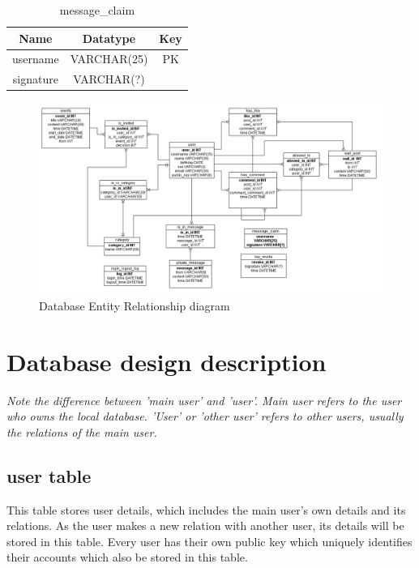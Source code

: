 \begin{table}[!ht]
\caption{message\_claim}
\centering
\begin{tabular}{c c c}
\hline\hline
Name               & Datatype    & Key \\
\hline
username           & VARCHAR(25) & PK  \\
signature          & VARCHAR(?)  &     \\
\hline
\end{tabular}
\label{table:nonlin}
\end{table}

\clearpage

\begin{landscape}
\begin{figure}[h]
    
    \includegraphics[width=1.4\textwidth]{images/design/project_er_diagram.png}
    \caption{Database Entity Relationship diagram}
    \label{fig:db_er_diag}
\end{figure}
\end{landscape}

\clearpage

\section{Database design description}
{\it Note the difference between 'main user' and 'user'. Main user refers to the user who owns the local database. 'User' or 'other user' refers to other users, usually the relations of the main user.}
\subsection{user table} 
This table stores user details, which includes the main user's own details and its relations. As the user makes a new relation with another user, its details will be stored in this table. Every user has their own public key which uniquely identifies their accounts which also be stored in this table.

